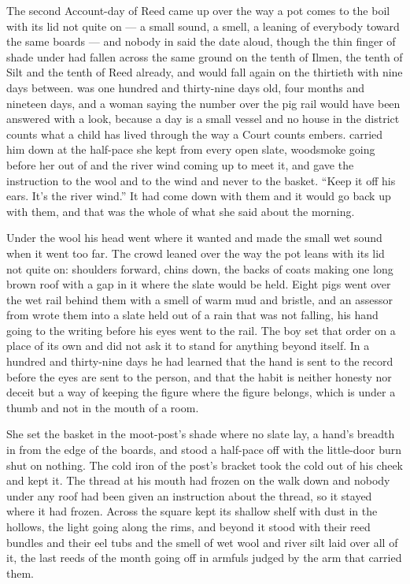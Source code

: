 
The second Account-day of Reed came up over  the way a pot comes to the boil with its lid not quite on --- a small sound, a smell, a leaning of everybody toward the same boards --- and nobody in  said the date aloud, though the thin finger of shade under  had fallen across the same ground on the tenth of Ilmen, the tenth of Silt and the tenth of Reed already, and would fall again on the thirtieth with nine days between.  was one hundred and thirty-nine days old, four months and nineteen days, and a woman saying the number over the pig rail would have been answered with a look, because a day is a small vessel and no house in the district counts what a child has lived through the way a Court counts embers.  carried him down at the half-pace she kept from every open slate, woodsmoke going before her out of  and the river wind coming up to meet it, and gave the instruction to the wool and to the wind and never to the basket. “Keep it off his ears. It's the river wind.” It had come down with them and it would go back up with them, and that was the whole of what she said about the morning.

Under the wool his head went where it wanted and made the small wet sound when it went too far. The crowd leaned over  the way the pot leans with its lid not quite on: shoulders forward, chins down, the backs of coats making one long brown roof with a gap in it where the slate would be held. Eight pigs went over the wet rail behind them with a smell of warm mud and bristle, and an assessor from  wrote them into a slate held out of a rain that was not falling, his hand going to the writing before his eyes went to the rail. The boy set that order on a place of its own and did not ask it to stand for anything beyond itself. In a hundred and thirty-nine days he had learned that the hand is sent to the record before the eyes are sent to the person, and that the habit is neither honesty nor deceit but a way of keeping the figure where the figure belongs, which is under a thumb and not in the mouth of a room.

She set the basket in the moot-post's shade where no slate lay, a hand's breadth in from the edge of the boards, and stood a half-pace off with the little-door burn shut on nothing. The cold iron of the post's bracket took the cold out of his cheek and kept it. The thread at his mouth had frozen on the walk down and nobody under any roof had been given an instruction about the thread, so it stayed where it had frozen. Across the square  kept its shallow shelf with dust in the hollows, the light going along the rims, and beyond it  stood with their reed bundles and their eel tubs and the smell of wet wool and river silt laid over all of it, the last reeds of the month going off in armfuls judged by the arm that carried them.

